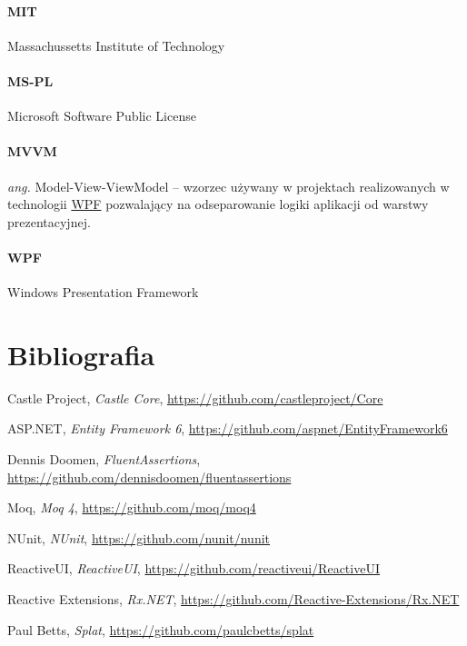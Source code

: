 \documentclass[10pt,a4paper]{article}
\begin{document}
\label{abbr:mit}
\paragraph{MIT} Massachussetts Institute of Technology  

\label{abbr:mspl}
\paragraph{MS-PL} Microsoft Software Public License

\label{abbr:mvvm}
\paragraph{MVVM} \emph{ang.} Model-View-ViewModel -- wzorzec używany w projektach realizowanych w technologii \hyperref[abbr:wpf]{WPF} pozwalający na odseparowanie logiki aplikacji od warstwy prezentacyjnej. 

\label{abbr:wpf}
\paragraph{WPF} Windows Presentation Framework

\renewcommand*{\refname}{\vspace*{-2em}}
\section{Bibliografia}
\begin{thebibliography}{99}

	Castle Project,
	\emph{Castle Core},
	\url{https://github.com/castleproject/Core}

	ASP.NET,
	\emph{Entity Framework 6},
	\url{https://github.com/aspnet/EntityFramework6}

	Dennis Doomen,
	\emph{FluentAssertions},
	\url{https://github.com/dennisdoomen/fluentassertions}

	Moq,
	\emph{Moq 4},
	\url{https://github.com/moq/moq4}

	NUnit,
	\emph{NUnit},
	\url{https://github.com/nunit/nunit}

	ReactiveUI,
	\emph{ReactiveUI},
	\url{https://github.com/reactiveui/ReactiveUI}

	Reactive Extensions,
	\emph{Rx.NET},
	\url{https://github.com/Reactive-Extensions/Rx.NET}

	Paul Betts,
	\emph{Splat},
	\url{https://github.com/paulcbetts/splat}

\end{thebibliography}
\end{document}
